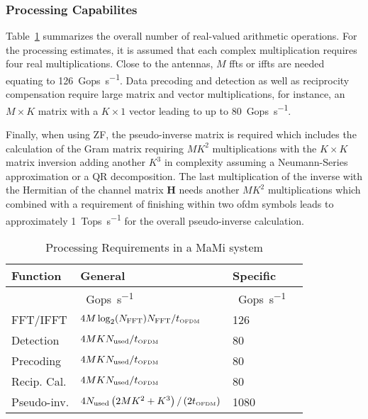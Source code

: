 \documentclass[journal]{IEEEtran}
\begin{document}
\subsubsection{Processing Capabilites}
\label{subsubsec:Processing_Capabilities}
Table~\ref{tab:hw_requirements} summarizes the overall number of real-valued arithmetic operations.
%
For the processing estimates, it is assumed that each complex multiplication requires four real multiplications.
Close to the antennas, $M$ \glspl{fft} or \glspl{ifft} are needed equating to \SI{126}{Gops\per s}.
Data precoding and detection as well as reciprocity compensation require large matrix and vector multiplications, for instance, an $M\times K$ matrix with a $K\times 1$ vector leading to up to \SI{80}{Gops\per s}.

Finally, when using ZF, the pseudo-inverse matrix is required which includes the calculation of the Gram matrix requiring $MK^2$ multiplications with the $K\times K$ matrix inversion adding another $K^3$ in complexity assuming a Neumann-Series approximation\cite{Prabhu2013} or a QR decomposition. The last multiplication of the inverse with the Hermitian of the channel matrix $\bm{H}$ needs another $MK^2$ multiplications which combined with a requirement of finishing within two \gls{ofdm} symbols leads to approximately \SI{1}{Tops\per\second} for the overall pseudo-inverse calculation.
\begin{table}[t]
	\centering
	\footnotesize
	\caption{Processing Requirements in a MaMi system}
	\noindent\begin{tabular}{llll}
		\toprule
		\textbf{Function} & \textbf{General} & \textbf{Specific} \\
		\midrule
		& \SI{}{Gops\per s} & \SI{}{Gops\per s}\\
		FFT/IFFT & $4 M \log_2(N_\text{FFT})N_\text{FFT}/t_\text{\tiny{OFDM}}$ & \num{126} \\
		Detection & $4 M K N_\text{used}/t_\text{\tiny{OFDM}}$ & \num{80} \\
		Precoding & $4 M K N_\text{used}/t_\text{\tiny{OFDM}}$ & \num{80} \\
		Recip. Cal. & $4 M K N_\text{used}/t_\text{\tiny{OFDM}}$ &\num{80} \\
		Pseudo-inv. & $4 N_\text{used}\left(2 MK^2 + K^3\right)/\left(2t_\text{\tiny{OFDM}}\right)$ & \num{1080}\\
		\bottomrule
	\end{tabular}
	\label{tab:hw_requirements}
\end{table}
%
\end{document}
